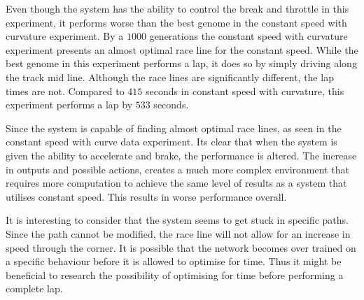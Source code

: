 Even though the system has the ability to control the break and throttle in this experiment, it performs worse than the best genome in the constant speed with curvature experiment. By a $1000$ generations the constant speed with curvature experiment presents an almost optimal race line for the constant speed. While the best genome in this experiment performs a lap, it does so by simply driving along the track mid line. Although the race lines are significantly different, the lap times are not. Compared to $415$ seconds in constant speed with curvature, this experiment performs a lap by $533$ seconds.

Since the system is capable of finding almost optimal race lines, as seen in the constant speed with curve data experiment. Its clear that when the system is given the ability to accelerate and brake, the performance is altered. The increase in outputs and possible actions, creates a much more complex environment that requires more computation to achieve the same level of results as a system that utilises constant speed. This results in worse performance overall.

It is interesting to consider that the system seems to get stuck in specific paths. Since the path cannot be modified, the race line will not allow for an increase in speed through the corner. It is possible that the network becomes over trained on a specific behaviour before it is allowed to optimise for time. Thus it might be beneficial to research the possibility of optimising for time before performing a complete lap. 



